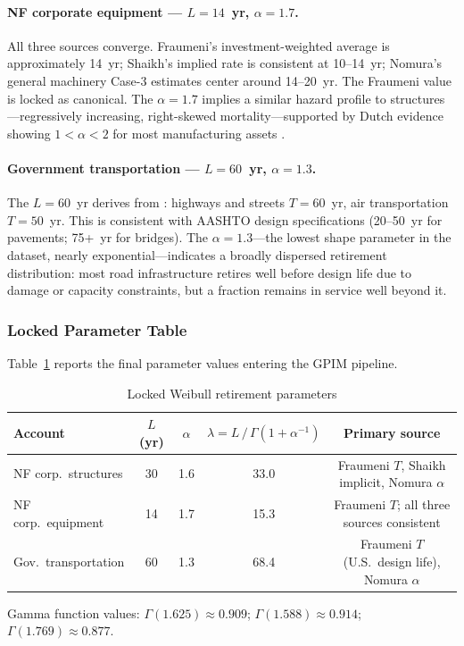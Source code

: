 \paragraph{NF corporate equipment --- $L = 14$~yr, $\alpha = 1.7$.}
All three sources converge. Fraumeni's investment-weighted average is
approximately 14~yr; Shaikh's implied rate is consistent at 10--14~yr; Nomura's
general machinery Case-3 estimates center around 14--20~yr. The Fraumeni value
is locked as canonical. The $\alpha = 1.7$ implies a similar hazard profile to
structures---regressively increasing, right-skewed mortality---supported by
Dutch evidence showing $1 < \alpha < 2$ for most manufacturing assets
\citep{Meinen1998}.

\paragraph{Government transportation --- $L = 60$~yr, $\alpha = 1.3$.}
The $L = 60$~yr derives from \citet[Table~3]{Fraumeni1997}: highways and streets
$T = 60$~yr, air transportation $T = 50$~yr. This is consistent with AASHTO
design specifications (20--50~yr for pavements; 75+~yr for bridges). The
$\alpha = 1.3$---the lowest shape parameter in the dataset, nearly
exponential---indicates a broadly dispersed retirement distribution: most road
infrastructure retires well before design life due to damage or capacity
constraints, but a fraction remains in service well beyond it.


\subsubsection{Locked Parameter Table}
\label{app:ret:locked_params}

Table~\ref{tab:ret:locked_params} reports the final parameter values entering
the GPIM pipeline.

\begin{table}[htbp]
\centering
\caption{Locked Weibull retirement parameters}
\label{tab:ret:locked_params}
\begin{threeparttable}
\begin{tabular}{lcccc}
\toprule
Account & $L$ (yr) & $\alpha$ & $\lambda = L\,/\,\Gamma(1 + \alpha^{-1})$ & Primary source \\
\midrule
NF corp.\ structures   & 30 & 1.6 & 33.0 & Fraumeni $T$, Shaikh implicit, Nomura $\alpha$ \\
NF corp.\ equipment    & 14 & 1.7 & 15.3 & Fraumeni $T$; all three sources consistent \\
Gov.\ transportation   & 60 & 1.3 & 68.4 & Fraumeni $T$ (U.S.\ design life), Nomura $\alpha$ \\
\bottomrule
\end{tabular}
\begin{tablenotes}
\small
\item Gamma function values: $\Gamma(1.625) \approx 0.909$;
$\Gamma(1.588) \approx 0.914$; $\Gamma(1.769) \approx 0.877$.
\end{tablenotes}
\end{threeparttable}
\end{table}


